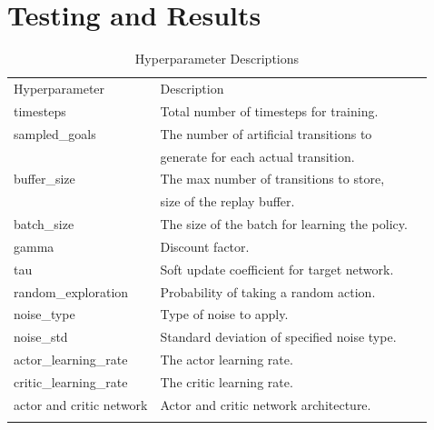 \section{Testing and Results}
\begin{table}
\caption{Hyperparameter Descriptions}
\label{tab:1}       %
\begin{tabular}{lll}
\hline\noalign{\smallskip}
Hyperparameter & Description\\
\noalign{\smallskip}\hline\noalign{\smallskip}
timesteps & Total number of timesteps for training.\\
sampled\_goals & The number of artificial transitions to \\
& generate for each actual transition. \\
buffer\_size & The max number of transitions to store,\\
&  size of the replay buffer.\\
batch\_size &  The size of the batch for learning the policy.\\
gamma & Discount factor.\\
tau & Soft update coefficient for target network.\\
random\_exploration & Probability of taking a random action.\\
noise\_type & Type of noise to apply.\\
noise\_std & Standard deviation of specified noise type.\\
actor\_learning\_rate & The actor learning rate.\\
critic\_learning\_rate & The critic learning rate.\\
actor and critic network & Actor and critic network architecture.\\

\noalign{\smallskip}\hline
\end{tabular}
\end{table}

